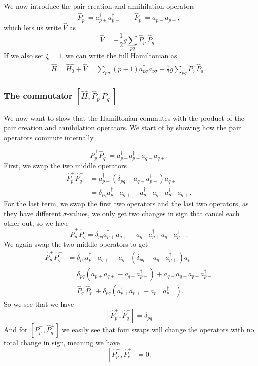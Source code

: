 \documentclass[a4paper, 11pt, notitlepage, english]{article}
\newcommand{\op}[1]{\hat{#1}}
\begin{document}
We now introduce the pair creation and annihilation operators
$$\op{P}_p^+ = a_{p+}^\dagger a_{p-}^\dagger \qquad \op{P}_p^- = a_{p-} a_{p+},$$
which lets us write $\op{V}$ as
$$\op{V} = -\frac{1}{2}g \sum_{pq} \op{P}_p^+ \op{P}_q^-.$$
If we also set $\xi=1$, we can write the full Hamiltonian as 
\begin{align*}
	\op{H} = \op{H_0} + \op{V} = \sum_{p \sigma} (p-1)a_{p\sigma}^\dagger a_{p\sigma}-\frac{1}{2}g \sum_{pq} \op{P}_p^+ \op{P}_q^-.
\end{align*}

\subsubsection*{The commutator $[\op{H}, \op{P}_p^+\op{P}_q^-]$}
We now want to show that the Hamiltonian commutes with the product of the pair creation and annihilation operators. We start of by showing how the pair operators commute internally.

$$\op{P}_p^+ \op{P}^-_q = a_{p+}^\dagger a_{p-}^\dagger a_{q-} a_{q+}.$$
First, we swap the two middle operators
\begin{align*}
\op{P}_p^+ \op{P}^-_q &= a_{p+}^\dagger (\delta_{pq} - a_{q-}a_{p-}^\dagger) a_{q+} \\
&= \delta_{pq} a_{p+}^\dagger a_{q+} - a_{p+}^\dagger a_{q-}a_{p-}^\dagger a_{q+}.
\end{align*}
For the last term, we swap the first two operators and the last two operators, as they have different $\sigma$-values, we only get two changes in sign that cancel each other out, so we have
$$\op{P}_p^+ \op{P}_q = \delta_{pq} a_{p+}^\dagger a_{q+} -  a_{q-}a_{p+}^\dagger a_{q+}a_{p-}^\dagger.$$
We again swap the two middle operators to get
\begin{align*}
\op{P}_p^+ \op{P}^-_q &= \delta_{pq} a_{p+}^\dagger a_{q+} -  a_{q-} (\delta_{pq} - a_{q+}a_{p+}^\dagger) a_{p-}^\dagger \\
&= \delta_{pq} (a_{p+}^\dagger a_{q+} -  a_{q-}a_{p-}^\dagger) + a_{q-}a_{q+}a_{p+}^\dagger a_{p-}^\dagger \\
&= \op{P}^-_q \op{P}_p^+ + \delta_{pq} (a_{p+}^\dagger a_{p+} -  a_{p-}a_{p-}^\dagger).
\end{align*}
So we see that we have
$$[\op{P}_p^+, \op{P}_q^-] = \delta_{pq}$$
And for $[\op{P}_p^{\pm}, \op{P}_q^\pm]$ we easily see that four swaps will change the operators with no total change in sign, meaning we have
$$[\op{P}_p^{\pm}, \op{P}_q^{\pm}] = 0.$$
\end{document}
